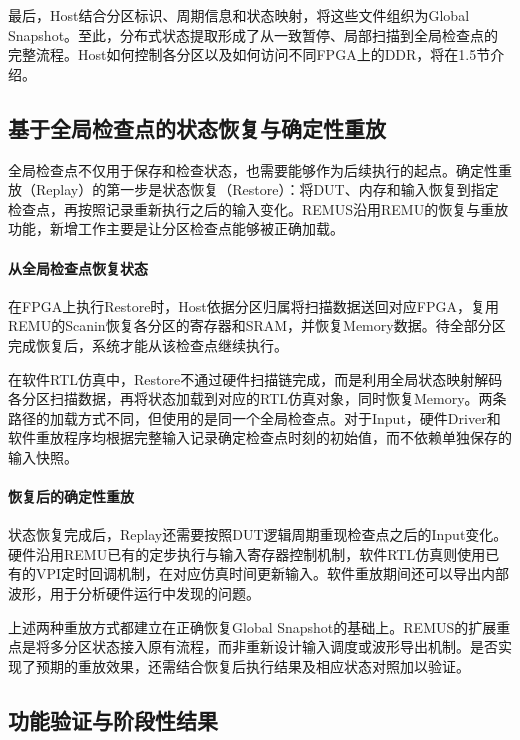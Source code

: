 最后，Host结合分区标识、周期信息和状态映射，将这些文件组织为Global Snapshot。至此，分布式状态提取形成了从一致暂停、局部扫描到全局检查点的完整流程。Host如何控制各分区以及如何访问不同FPGA上的DDR，将在1.5节介绍。

\subsection{基于全局检查点的状态恢复与确定性重放}
\label{sec:midterm-state-restore-replay}

全局检查点不仅用于保存和检查状态，也需要能够作为后续执行的起点。确定性重放（Replay）的第一步是状态恢复（Restore）：将DUT、内存和输入恢复到指定检查点，再按照记录重新执行之后的输入变化。REMUS沿用REMU的恢复与重放功能，新增工作主要是让分区检查点能够被正确加载。

\paragraph{从全局检查点恢复状态}

在FPGA上执行Restore时，Host依据分区归属将扫描数据送回对应FPGA，复用REMU的Scanin恢复各分区的寄存器和SRAM，并恢复Memory数据。待全部分区完成恢复后，系统才能从该检查点继续执行。

在软件RTL仿真中，Restore不通过硬件扫描链完成，而是利用全局状态映射解码各分区扫描数据，再将状态加载到对应的RTL仿真对象，同时恢复Memory。两条路径的加载方式不同，但使用的是同一个全局检查点。对于Input，硬件Driver和软件重放程序均根据完整输入记录确定检查点时刻的初始值，而不依赖单独保存的输入快照。

\paragraph{恢复后的确定性重放}

状态恢复完成后，Replay还需要按照DUT逻辑周期重现检查点之后的Input变化。硬件沿用REMU已有的定步执行与输入寄存器控制机制，软件RTL仿真则使用已有的VPI定时回调机制，在对应仿真时间更新输入。软件重放期间还可以导出内部波形，用于分析硬件运行中发现的问题。

上述两种重放方式都建立在正确恢复Global Snapshot的基础上。REMUS的扩展重点是将多分区状态接入原有流程，而非重新设计输入调度或波形导出机制。是否实现了预期的重放效果，还需结合恢复后执行结果及相应状态对照加以验证。

\subsection{功能验证与阶段性结果}
\label{sec:midterm-state-validation}

